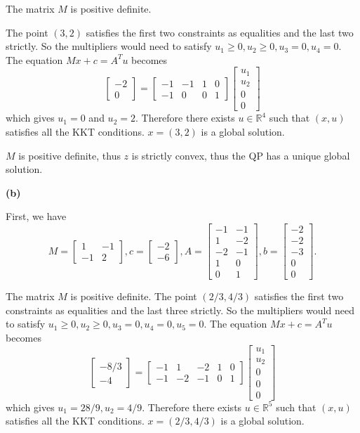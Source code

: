 \documentclass[12pt]{article}
\begin{document}
The matrix $M$ is positive definite.

The point $(3,2)$ satisfies the first two constraints as equalities and the last two strictly. So the multipliers would need to satisfy $u_1\ge 0,u_2\ge0,u_3=0,u_4=0$. The equation $Mx+c=A^Tu$ becomes 
\[\begin{bmatrix}-2\\0\end{bmatrix} = \begin{bmatrix} -1&-1&1&0\\-1&0&0&1 \end{bmatrix} \begin{bmatrix} u_1\\u_2\\0\\0 \end{bmatrix}\]
which gives $u_1=0$ and $u_2=2$. Therefore there exists $u\in \mathbb{R}^4$ such that $(x,u)$ satisfies all the KKT conditions. $x = (3, 2)$ is a global
solution.

$M$ is positive definite, thus $z$ is strictly convex, thus the QP has a unique global solution.


\noindent
\textbf{(b)}

First, we have 
\[M = \begin{bmatrix} 1&-1\\-1&2 \end{bmatrix}, c= \begin{bmatrix} -2\\-6 \end{bmatrix}, A=\begin{bmatrix} -1&-1\\1&-2\\-2&-1\\1&0\\0&1 \end{bmatrix},b=\begin{bmatrix} -2\\-2\\-3\\0\\0 \end{bmatrix}.\]

The matrix $M$ is positive definite. 
The point $(2/3,4/3)$ satisfies the first two constraints as equalities and the last three strictly. So the multipliers would need to satisfy $u_1\ge0,u_2\ge0,u_3=0,u_4=0,u_5=0$. The equation $Mx+c=A^Tu$ becomes 
\[\begin{bmatrix}-8/3\\-4\end{bmatrix} = \begin{bmatrix} -1&1&-2&1&0\\-1&-2&-1&0&1 \end{bmatrix} \begin{bmatrix} u_1\\u_2\\0\\0\\0 \end{bmatrix}\]
which gives $u_1=28/9,u_2=4/9$. Therefore there exists $u\in \mathbb{R}^5$ such that $(x,u)$ satisfies all the KKT conditions. $x = (2/3, 4/3)$ is a global solution.
\end{document}

